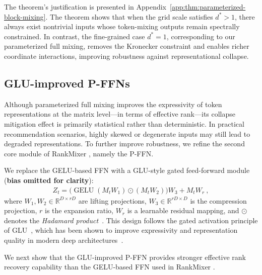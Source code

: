 \documentclass[sigconf,screen]{acmart}
\newcommand{\rankmixer}{RankMixer }
\begin{document}
The theorem's justification is presented in Appendix~\ref{app:thm:parameterized-block-mixing}. 
The theorem shows that when the grid scale satisfies \(d^{\ast}>1\), there always exist nontrivial inputs whose token-mixing outputs remain spectrally constrained. 
In contrast, the fine-grained case \(d^{\ast}=1\), corresponding to our parameterized full mixing, removes the Kronecker constraint and enables richer coordinate interactions, improving robustness against representational collapse.


\subsection{GLU-improved P-FFNs}\label{sec:method:geglu-ffn}
Although parameterized full mixing improves the expressivity of token representations at the matrix level—in terms of effective rank—its collapse mitigation effect is primarily statistical rather than deterministic. 
In practical recommendation scenarios, highly skewed or degenerate inputs may still lead to degraded representations. 
To further improve robustness, we refine the second core module of \rankmixer, namely the P-FFN.

We replace the GELU-based FFN with a GLU-style gated feed-forward module (\textbf{bias omitted for clarity}):
\begin{align}
\label{eq:geglu-ffn}
Z_t = \big(\operatorname{GELU}(M_t W_1)\odot(M_t W_2)\big)W_3 + M_t W_r\ ,
\end{align}
where \(W_1, W_2\in\mathbb{R}^{D\times rD}\) are lifting projections, \(W_3\in\mathbb{R}^{rD\times D}\) is the compression projection, \(r\) is the expansion ratio, \(W_r\) is a learnable residual mapping, and $\odot$ denotes the \textit{Hadamard product}~\cite{linear-algebra}. 
This design follows the gated activation principle of GLU~\cite{GLU-activation}, which has been shown to improve expressivity and representation quality in modern deep architectures~\cite{GLU-llm-1,GLU-llm-2,GLU-llm-3}.

We next show that the GLU-improved P-FFN provides stronger effective rank recovery capability than the GELU-based FFN used in \rankmixer.
\end{document}
